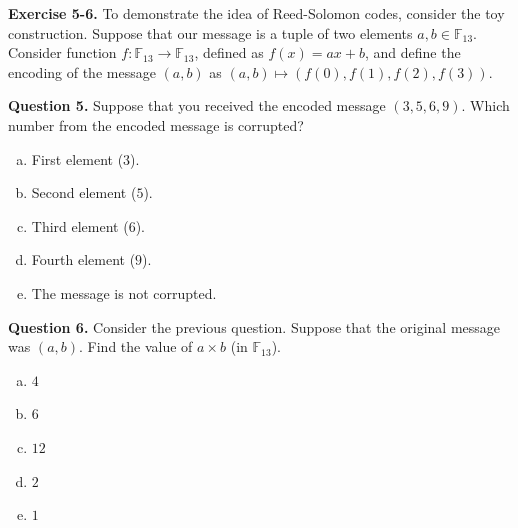 \documentclass[../lecture-notes.tex]{subfiles}
\begin{document}
\textbf{Exercise 5-6.} To demonstrate the idea of Reed-Solomon codes, consider the toy construction. Suppose that our message is a tuple of two elements $a,b \in \mathbb{F}_{13}$. Consider function $f: \mathbb{F}_{13} \to \mathbb{F}_{13}$, defined as $f(x) = ax+b$, and define the encoding of the message $(a,b)$ as $(a,b) \mapsto (f(0),f(1),f(2),f(3))$. 

\textbf{Question 5.} Suppose that you received the encoded message $(3,5,6,9)$. Which number from the encoded message is corrupted?
\begin{enumerate}[a)]
    \item First element ($3$).
    \item Second element ($5$).
    \item Third element ($6$).
    \item Fourth element ($9$).
    \item The message is not corrupted.
\end{enumerate}

\textbf{Question 6.} Consider the previous question. Suppose that the original message was $(a,b)$. Find the value of $a \times b$ (in $\mathbb{F}_{13}$).
\begin{enumerate}[a)]
    \item $4$
    \item $6$
    \item $12$
    \item $2$
    \item $1$
\end{enumerate}
\end{document}
